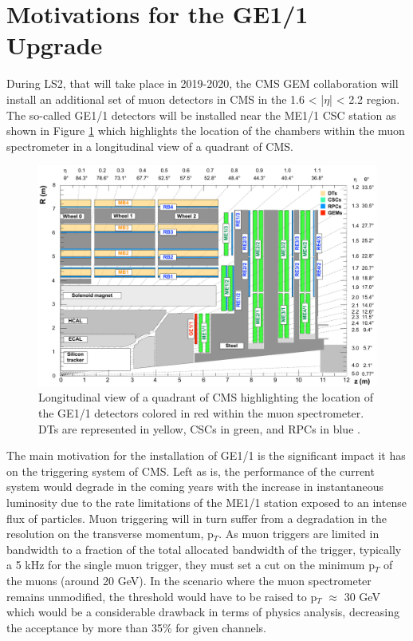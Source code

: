   \section{Motivations for the GE1/1 Upgrade}

    During LS2, that will take place in 2019-2020, the CMS GEM collaboration \cite{Colaleo:2021453} will install an additional set of muon detectors in CMS in the 1.6 < |$\eta$| < 2.2 region. The so-called GE1/1 detectors will be installed near the ME1/1 CSC station as shown in Figure \ref{fig:II-1-ge11} which highlights the location of the chambers within the muon spectrometer in a longitudinal view of a quadrant of CMS. \\

    \begin{figure}[t!]
      \centering
      \includegraphics[width=\textwidth]{img/II-1-gem/ge11-quadrant.pdf}
      \caption{Longitudinal view of a quadrant of CMS highlighting the location of the GE1/1 detectors colored in red within the muon spectrometer. DTs are represented in yellow, CSCs in green, and RPCs in blue \cite{Colaleo:2021453}.}
      \label{fig:II-1-ge11}
    \end{figure}

    The main motivation for the installation of GE1/1 is the significant impact it has on the triggering system of CMS. Left as is, the performance of the current system would degrade in the coming years with the increase in instantaneous luminosity due to the rate limitations of the ME1/1 station exposed to an intense flux of particles. Muon triggering will in turn suffer from a degradation in the resolution on the transverse momentum, p$_T$. As muon triggers are limited in bandwidth to a fraction of the total allocated bandwidth of the trigger, typically a 5 kHz for the single muon trigger, they must set a cut on the minimum p$_T$ of the muons (around 20 GeV). In the scenario where the muon spectrometer remains unmodified, the threshold would have to be raised to p$_T$ $ \approx $ 30 GeV which would be a considerable drawback in terms of physics analysis, decreasing the acceptance by more than 35\% for given channels. \\

